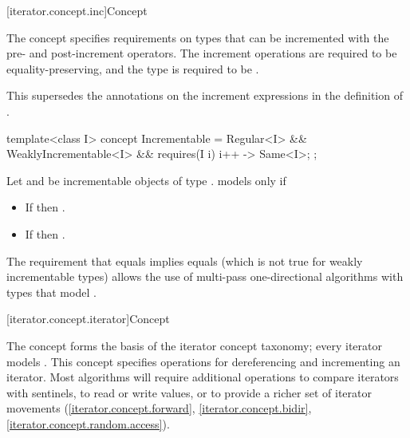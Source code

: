 \documentclass{wg21}
\begin{document}
[iterator.concept.inc]{Concept }

\pnum
The  concept specifies requirements on types that can be incremented with the pre-
and post-increment operators. The increment operations are required to be equality-preserving,
and the type is required to be .
\begin{note}
	This supersedes the annotations on the increment expressions
	in the definition of .
\end{note}

%
\begin{codeblock}
	template<class I>
	concept Incrementable =
	Regular<I> &&
	WeaklyIncrementable<I> &&
	requires(I i) {
		{ i++ } -> Same<I>;
	};
\end{codeblock}

\pnum
Let  and  be incrementable objects of type .
 models  only if

\begin{itemize}
	\item If  then .
	\item If  then .
\end{itemize}

\pnum
\begin{note}
	The requirement that
	 equals 
	implies
	 equals 
	(which is not true for weakly incrementable types)
	allows the use of multi-pass one-directional
	algorithms with types that model .
\end{note}

[iterator.concept.iterator]{Concept }

\pnum
The  concept forms the basis
of the iterator concept taxonomy; every iterator models .
This concept specifies operations for dereferencing and incrementing
an iterator. Most algorithms will require additional operations
to compare iterators with sentinels, to
read or write values, or
to provide a richer set of iterator movements (\ref{iterator.concept.forward},
\ref{iterator.concept.bidir}, \ref{iterator.concept.random.access}).
\end{document}
